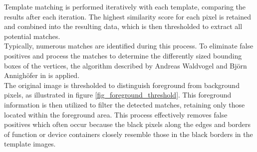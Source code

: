 Template matching is performed iteratively with each template, comparing the results after each iteration. The highest similarity score for each pixel is retained and combined into the resulting data, which is then thresholded to extract all potential matches.\\
Typically, numerous matches are identified during this process. To eliminate false positives and process the matches to determine the differently sized bounding boxes of the vertices, the algorithm described by Andreas Waldvogel and Björn Annighöfer in \cite{og_paper} is applied.\\
The original image is thresholded to distinguish foreground from background pixels, as illustrated in figure \ref{fig_foreground_threshold}. This foreground information is then utilized to filter the detected matches, retaining only those located within the foreground area. This process effectively removes false positives which often occur because the black pixels along the edges and borders of function or device containers closely resemble those in the black borders in the template images.
